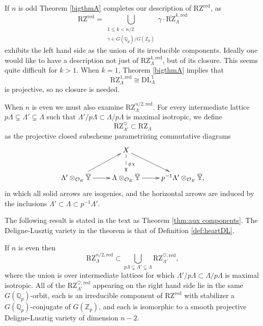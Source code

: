 \documentclass[11pt]{alggeom}
\newcommand{\iso}{\cong}
\newcommand{\red}{\mathrm{red}}
\newcommand{\Q}{\mathbb Q}
\newcommand{\Z}{\mathbb Z}
\newcommand{\co}{\mathcal O}
\begin{document}
 
 If $n$ is odd Theorem \ref{bigthmA} completes our description of $\mathrm{RZ}^\red$, as 
 \[
 \mathrm{RZ}^\red= 
  \bigcup_{ \substack{ 1\le k < n/2  \\  \gamma \in G(\Q_p)/G(\Z_p)} }   \gamma \cdot \overline{\mathrm{RZ}}_\Lambda^{k,\red} 
 \]
exhibits the left hand side as the union of its irreducible components.
Ideally one would like to have a description not just of $\mathrm{RZ}_\Lambda^{k,\red}$, but of its closure.  This seems quite difficult for  $k>1$.
When  $k=1$, Theorem \ref{bigthmA}  implies that 
\[ \mathrm{RZ}_\Lambda^{1,\red}\iso \mathrm{DL}_\Lambda^1\]  is   projective, so no closure is needed.

 
 When $n$ is even we must also examine $\mathrm{RZ}_\Lambda^{n/2,\red}$.     For every intermediate lattice 
 $
 p\Lambda \subsetneq \Lambda' \subsetneq \Lambda
 $
 such that $\Lambda'/p\Lambda \subset \Lambda/p\Lambda$ is maximal isotropic, we define  
 \[
 \mathrm{RZ}^\heartsuit_{\Lambda'} \subset \mathrm{RZ}_\Lambda
 \]
 as the projective closed subscheme parametrizing commutative diagrams
 \[
\xymatrix{
&{ X }\ar@{-->}[d]^{\varrho_X}  \ar[dr] \\
{ \Lambda' \otimes_{\co_E}\overline{\mathbb{Y}}}  \ar[r] \ar[ur] & { \Lambda \otimes_{\co_E}\overline{\mathbb{Y}}}   \ar[r] & { p^{-1}\Lambda' \otimes_{\co_E}\overline{\mathbb{Y}}} ,
}
\]
in which all solid arrows are isogenies, and the horizontal arrows are induced by the inclusions
$\Lambda' \subset \Lambda \subset p^{-1}\Lambda'$.




The following result is stated in the text as Theorem \ref{thm:aux components}.  
 The Deligne-Lusztig variety in the theorem is that of Definition  \ref{def:heartDL}.

\begin{bigtheorem}\label{bigthmB}
If $n$ is even then
\[
\mathrm{RZ}_\Lambda^{n/2,\red} \subset 
 \bigcup_{ p\Lambda  \subsetneq \Lambda'  \subsetneq \Lambda}  \mathrm{RZ}_{\Lambda'}^{\heartsuit ,\red},
\]
where the union is over   intermediate lattices  for which $\Lambda'/p\Lambda \subset \Lambda/p\Lambda$ is maximal isotropic.  
All of the $ \mathrm{RZ}_{\Lambda'}^{\heartsuit ,\red}$  appearing on the right hand side lie in the same $G(\Q_p)$-orbit,  each is 
an irreducible component of $\mathrm{RZ}^\red$ with stabilizer a $G(\Q_p)$-conjugate of $G(\Z_p)$, and each is isomorphic to a smooth projective Deligne-Lusztig variety of dimension $n-2$.
\end{bigtheorem}
\end{document}
